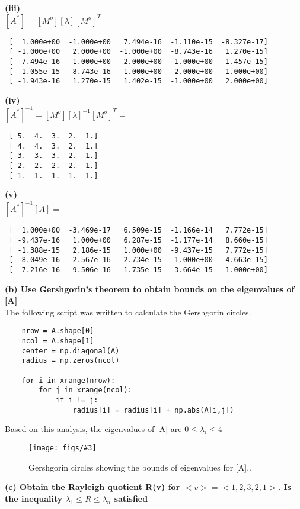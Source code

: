 \documentclass[letterpaper, 10pt, oneside]{article}
\newenvironment{dd}[1]{
	\noindent
	\textbf{\normalsize{#1}}
	\hspace{0.1in}
	\small
	\rmfamily
	}
	{\medskip}
\newcommand{\bdd}{\begin{dd}}
\newcommand{\edd}{\end{dd}}
\newcommand{\Figure}[4]{
  \begin{figure}[#1]
    \centering
    \texttt{[image: figs/\#3]}
    \caption{#4.}\label{fig:#3}
  \end{figure}}
\begin{document}
\bf{(iii)} \\

$[A^*] = [M^o][\lambda][M^o]^T =$ 
\begin{lstlisting}
 [  1.000e+00  -1.000e+00   7.494e-16  -1.110e-15  -8.327e-17]
 [ -1.000e+00   2.000e+00  -1.000e+00  -8.743e-16   1.270e-15]
 [  7.494e-16  -1.000e+00   2.000e+00  -1.000e+00   1.457e-15]
 [ -1.055e-15  -8.743e-16  -1.000e+00   2.000e+00  -1.000e+00]
 [ -1.943e-16   1.270e-15   1.402e-15  -1.000e+00   2.000e+00]
\end{lstlisting}

\bf{(iv)} \\

$[A^*]^{-1} = [M^o][\lambda]^{-1}[M^o]^T =$ 
\begin{lstlisting}
 [ 5.  4.  3.  2.  1.]
 [ 4.  4.  3.  2.  1.]
 [ 3.  3.  3.  2.  1.]
 [ 2.  2.  2.  2.  1.]
 [ 1.  1.  1.  1.  1.]
\end{lstlisting}

\bf{(v)} \\

$[A^*]^{-1}[A] =$ 
\begin{lstlisting}
 [  1.000e+00  -3.469e-17   6.509e-15  -1.166e-14   7.772e-15]
 [ -9.437e-16   1.000e+00   6.287e-15  -1.177e-14   8.660e-15]
 [ -1.388e-15   2.186e-15   1.000e+00  -9.437e-15   7.772e-15]
 [ -8.049e-16  -2.567e-16   2.734e-15   1.000e+00   4.663e-15]
 [ -7.216e-16   9.506e-16   1.735e-15  -3.664e-15   1.000e+00]
\end{lstlisting}
\edd

\bdd{(b)  Use Gershgorin's theorem to obtain bounds on the eigenvalues of [A]}\\
The following script was written to calculate the Gershgorin circles.

\begin{lstlisting}
	nrow = A.shape[0]
	ncol = A.shape[1]
	center = np.diagonal(A)
	radius = np.zeros(ncol)

	for i in xrange(nrow):
	    for j in xrange(ncol):
	        if i != j:
	            radius[i] = radius[i] + np.abs(A[i,j])
\end{lstlisting}

Based on this analysis, the eigenvalues of [A] are $0 \le \lambda_i \le 4$

\Figure{htp}{4}{plot_3b.pdf}{Gershgorin circles showing the bounds of eigenvalues for [A].}
\edd

\bdd{(c) Obtain the Rayleigh quotient R({v}) for $<v> = <1, 2, 3, 2, 1>$. Is the inequality
$\lambda_1 \le R \le \lambda_n$ satisfied}
\end{document}
